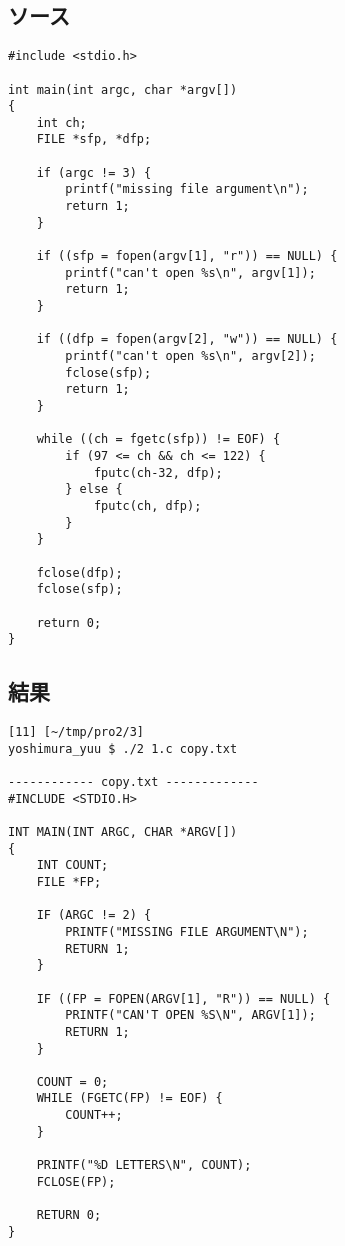 \documentclass[11pt,a4paper,a4j]{jsarticle}
\begin{document}
\subsection{ソース}
\begin{shadebox}
\begin{verbatim}
#include <stdio.h>

int main(int argc, char *argv[])
{
    int ch;
    FILE *sfp, *dfp;

    if (argc != 3) {
        printf("missing file argument\n");
        return 1;
    }

    if ((sfp = fopen(argv[1], "r")) == NULL) {
        printf("can't open %s\n", argv[1]);
        return 1;
    }

    if ((dfp = fopen(argv[2], "w")) == NULL) {
        printf("can't open %s\n", argv[2]);
        fclose(sfp);
        return 1;
    }

    while ((ch = fgetc(sfp)) != EOF) {
        if (97 <= ch && ch <= 122) { 
            fputc(ch-32, dfp);
        } else {
            fputc(ch, dfp);
        }
    }

    fclose(dfp);
    fclose(sfp);

    return 0;
}
\end{verbatim}
\end{shadebox}

\subsection{結果}
\begin{shadebox}
\begin{verbatim}
[11] [~/tmp/pro2/3]
yoshimura_yuu $ ./2 1.c copy.txt

------------ copy.txt -------------
#INCLUDE <STDIO.H>

INT MAIN(INT ARGC, CHAR *ARGV[])
{
    INT COUNT;
    FILE *FP;

    IF (ARGC != 2) {
        PRINTF("MISSING FILE ARGUMENT\N");
        RETURN 1;
    }

    IF ((FP = FOPEN(ARGV[1], "R")) == NULL) {
        PRINTF("CAN'T OPEN %S\N", ARGV[1]);
        RETURN 1;
    }

    COUNT = 0;
    WHILE (FGETC(FP) != EOF) {
        COUNT++;
    }

    PRINTF("%D LETTERS\N", COUNT);
    FCLOSE(FP);

    RETURN 0;
}
\end{verbatim}
\end{shadebox}
\end{document}
